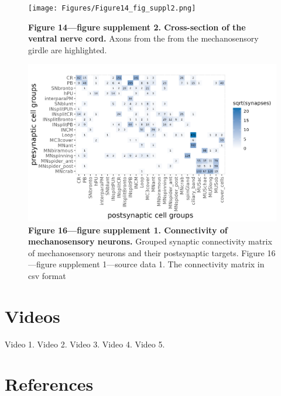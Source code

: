 \documentclass[
  11pt,
]{article}
\begin{document}
\begin{figure}[H]

{\centering \texttt{[image: Figures/Figure14\_fig\_suppl2.png]}

}

\caption{\textbf{Figure 14---figure supplement 2. Cross-section of the
ventral nerve cord. } Axons from the from the mechanosensory girdle are
highlighted.}

\end{figure}%

\begin{figure}[H]

{\centering \includegraphics[width=1\textwidth,height=\textheight]{Figures/Figure16_fig_suppl1.png}

}

\caption{\textbf{Figure 16---figure supplement 1. Connectivity of
mechanosensory neurons. } Grouped synaptic connectivity matrix of
mechanosensory neurons and their postsynaptic targets. Figure
16---figure supplement 1---source data 1. The connectivity matrix in csv
format}

\end{figure}%

\section{Videos}\label{videos}

Video 1. Video 2. Video 3. Video 4. Video 5.

\hfill\break

\section{References}\label{references}
\end{document}
